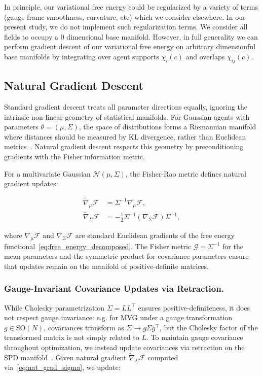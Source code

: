 \documentclass[twoside,11pt]{article}
\begin{document}
In principle, our variational free energy could be regularized by a variety of terms (gauge frame smoothness, curvature, etc) which we consider elsewhere. In our present study, we do not implement such regularization terms. We consider all fields to occupy a $0$ dimensional base manifold. However, in full generality we can perform gradient descent of our variational free energy on arbitrary dimensionful base manifolds by integrating over agent supports $\chi_i(c)$ and overlaps $\chi_{ij}(c)$.


\subsection{Natural Gradient Descent}

Standard gradient descent treats all parameter directions equally, ignoring the intrinsic non-linear geometry of statistical manifolds. For Gaussian agents with parameters $\theta = (\mu, \Sigma)$, the space of distributions forms a Riemannian manifold where distances should be measured by KL divergence, rather than Euclidean metrics~\citep{amari1998natural,martens2015optimizing}. Natural gradient descent respects this geometry by preconditioning gradients with the Fisher information metric.

For a multivariate Gaussian $\mathcal{N}(\mu, \Sigma)$, the Fisher-Rao metric defines natural gradient updates:

\begin{align}
\tilde{\nabla}_\mu \mathcal{F}&= \Sigma^{-1} \nabla_\mu \mathcal{F}, \label{eq:nat_grad_mu} \\
\tilde{\nabla}_\Sigma \mathcal{F} &= -\tfrac{1}{2} \Sigma^{-1} (\nabla_\Sigma \mathcal{F}) \Sigma^{-1}, \label{eq:nat_grad_sigma}
\end{align}

where $\nabla_\mu \mathcal{F}$ and $\nabla_\Sigma \mathcal{F}$ are standard Euclidean gradients of the free energy functional~\eqref{eq:free_energy_decomposed}. The Fisher metric $\mathscr{G} = \Sigma^{-1}$ for the mean parameters and the symmetric product for covariance parameters ensure that updates remain on the manifold of positive-definite matrices.

\subsubsection{Gauge-Invariant Covariance Updates via Retraction.}  

While Cholesky parametrization $\Sigma = LL^\top$ ensures positive-definiteness, it does not respect gauge invariance: e.g. for MVG under a gauge transformation $g \in \text{SO}(N)$, covariances transform as $\Sigma \to g\Sigma g^\top$, but the Cholesky factor of the transformed matrix is not simply related to $L$. To maintain gauge covariance throughout optimization, we instead update covariances via retraction on the SPD manifold~\citep{absil2008optimization}. Given natural gradient $\tilde{\nabla}_\Sigma \mathcal{F}$ computed via~\eqref{eq:nat_grad_sigma}, we update:
\end{document}

